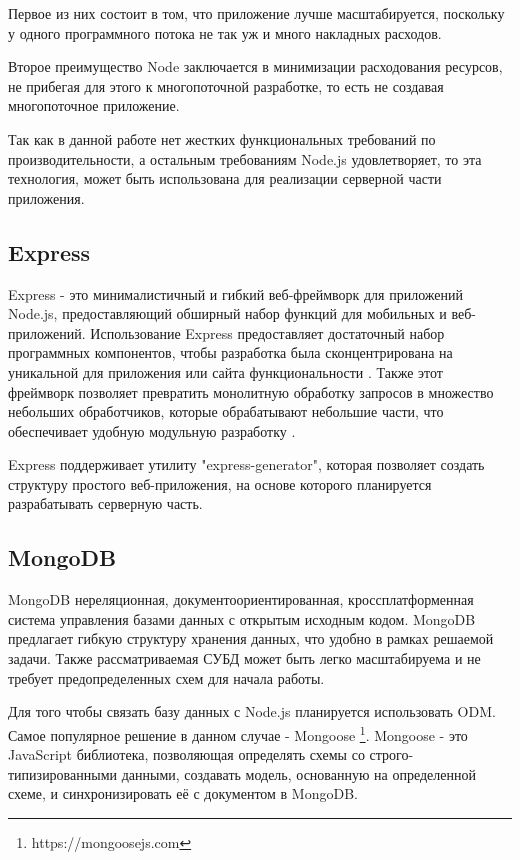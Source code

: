 \documentclass[%
  a5paper,
  subf,
  href,
  master,
  dotsinheaders 
]{csse-fcs}
\begin{document}
Первое из них состоит в том, что приложение лучше масштабируется, поскольку у одного программного потока не так уж и много накладных расходов.  

Второе преимущество Node заключается в минимизации расходования ресурсов, не прибегая для этого к многопоточной разработке, то есть не создавая многопоточное приложение.

Так как в данной работе нет жестких функциональных требований по производительности, а остальным требованиям Node.js удовлетворяет, то эта технология, может быть использована для реализации серверной части приложения.


\subsection{Express}
Express - это минималистичный и гибкий веб-фреймворк для приложений Node.js, предоставляющий обширный набор функций для мобильных и веб-приложений. Использование Express предоставляет достаточный набор программных компонентов, чтобы разработка была сконцентрирована на уникальной для приложения или сайта функциональности \cite{express}. Также этот фреймворк позволяет превратить монолитную обработку запросов в множество небольших обработчиков, которые обрабатывают небольшие части, что обеспечивает удобную модульную разработку \cite{nodeexpress}.

Express поддерживает утилиту "express-generator"{}, которая позволяет создать структуру простого веб-приложения, на основе которого планируется разрабатывать серверную часть.


\subsection{MongoDB}

MongoDB нереляционная, документоориентированная, кроссплатформенная система управления базами данных с открытым исходным кодом. MongoDB предлагает гибкую структуру хранения данных, что удобно в рамках решаемой задачи. Также рассматриваемая СУБД может быть легко масштабируема и не требует предопределенных схем для начала работы.

Для того чтобы связать базу данных с Node.js планируется использовать ODM. Самое популярное решение в данном случае - Mongoose \footnote{https://mongoosejs.com}. Mongoose - это JavaScript библиотека, позволяющая определять схемы со строго-типизированными данными, создавать модель, основанную на определенной схеме, и синхронизировать её с документом в MongoDB.
\end{document}
